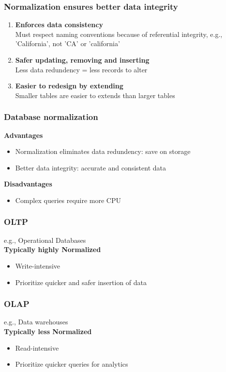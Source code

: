 \subsubsection{Normalization ensures better data integrity}
\begin{enumerate}
    \item \textbf{Enforces data consistency} \\
    Must respect naming conventions because of referential integrity, e.g., 'California', not 'CA' or 'california'
    \item \textbf{Safer updating, removing and inserting} \\
    Less data redundency = less records to alter
    \item \textbf{Easier to redesign by extending} \\
    Smaller tables are easier to extends than larger tables
\end{enumerate}

\subsubsection{Database normalization}
\textbf{Advantages}
\begin{itemize}
    \item Normalization eliminates data redundency: save on storage
    \item Better data integrity: accurate and consistent data
\end{itemize}

\textbf{Disadvantages}
\begin{itemize}
    \item Complex queries require more CPU
\end{itemize}

\subsubsection{OLTP}
e.g., Operational Databases \\
\textbf{Typically highly Normalized}
\begin{itemize}
    \item Write-intensive
    \item Prioritize quicker and safer insertion of data
\end{itemize}

\subsubsection{OLAP}
e.g., Data warehouses \\
\textbf{Typically less Normalized}
\begin{itemize}
    \item Read-intensive
    \item Prioritize quicker queries for analytics
\end{itemize}

